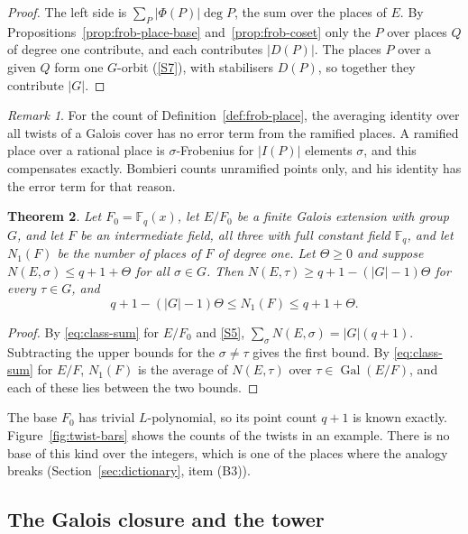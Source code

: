 \documentclass[11pt]{amsbook}
\theoremstyle{plain}
\newtheorem{theorem}{Theorem}[section]
\theoremstyle{definition}
\theoremstyle{remark}
\newtheorem{remark}[theorem]{Remark}
\numberwithin{equation}{section}
\numberwithin{figure}{chapter}
\numberwithin{table}{chapter}
\newcommand{\F}{\mathbb{F}}
\newcommand{\Gal}{\operatorname{Gal}}
\begin{document}
\begin{proof}
The left side is $\sum_P\lvert\Phi(P)\rvert\deg P$, the sum over
the places of $E$. By Propositions~\ref{prop:frob-place-base}
and~\ref{prop:frob-coset} only the $P$ over places $Q$ of degree
one contribute, and each contributes $\lvert D(P)\rvert$. The
places $P$ over a given $Q$ form one $G$-orbit (\ref{S7}), with
stabilisers $D(P)$, so together they contribute $\lvert G\rvert$.
\end{proof}

\begin{remark}\label{rem:class-sum-error}
For the count of Definition~\ref{def:frob-place}, the averaging
identity over all twists of a Galois cover has no error term from
the ramified places. A ramified place over a rational place is
$\sigma$-Frobenius for $\lvert I(P)\rvert$ elements $\sigma$, and
this compensates exactly. Bombieri counts unramified points only,
and his identity has the error term for that reason.
\end{remark}

\begin{theorem}\label{thm:averaging}
Let $F_0=\F_q(x)$, let $E/F_0$ be a finite Galois extension with
group $G$, and let $F$ be an intermediate field, all three with
full constant field $\F_q$, and let $N_1(F)$ be the number of
places of $F$ of degree one. Let $\Theta\ge0$ and suppose
$N(E,\sigma)\le q+1+\Theta$ for all $\sigma\in G$. Then
$N(E,\tau)\ge q+1-(\lvert G\rvert-1)\Theta$ for every $\tau\in G$,
and
\[
q+1-(\lvert G\rvert-1)\Theta\le N_1(F)\le q+1+\Theta.
\]
\end{theorem}

\begin{proof}
By \eqref{eq:class-sum} for $E/F_0$ and \ref{S5},
$\sum_\sigma N(E,\sigma)=\lvert G\rvert(q+1)$. Subtracting the
upper bounds for the $\sigma\ne\tau$ gives the first bound. By
\eqref{eq:class-sum} for $E/F$, $N_1(F)$ is the average of
$N(E,\tau)$ over $\tau\in\Gal(E/F)$, and each of these lies between
the two bounds.
\end{proof}

The base $F_0$ has trivial $L$-polynomial, so its point count $q+1$
is known exactly. Figure~\ref{fig:twist-bars} shows the counts of
the twists in an example. There is no base of
this kind over the integers, which is one of the places where the
analogy breaks (Section~\ref{sec:dictionary}, item (B3)).

\subsection{The Galois closure and the tower}
\label{subsec:closure}
\end{document}
